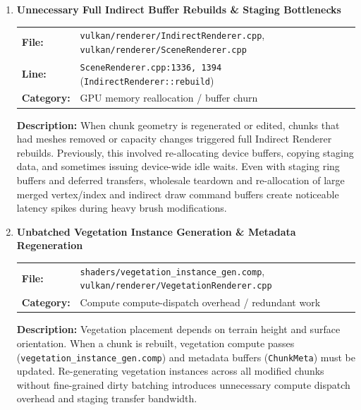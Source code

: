\documentclass[a4paper,12pt]{article}
\newcommand{\severitybox}[2]{%
  \colorbox{#1}{\makebox[2.5cm][c]{\textcolor{white}{\textbf{#2}}}}%
}
\begin{document}
\begin{enumerate}[leftmargin=*]

\item[\textbf{[CR4]}] \textbf{Unnecessary Full Indirect Buffer Rebuilds \& Staging Bottlenecks}
  \hfill \severitybox{highcolor}{HIGH}

  \begin{tabular}{ll}
    \textbf{File:} & \texttt{vulkan/renderer/IndirectRenderer.cpp}, \texttt{vulkan/renderer/SceneRenderer.cpp} \\
    \textbf{Line:} & \texttt{SceneRenderer.cpp:1336, 1394} (\texttt{IndirectRenderer::rebuild}) \\
    \textbf{Category:} & GPU memory reallocation / buffer churn \\
  \end{tabular}

  \textbf{Description:}
  When chunk geometry is regenerated or edited, chunks that had meshes removed or capacity changes triggered full Indirect Renderer rebuilds. Previously, this involved re-allocating device buffers, copying staging data, and sometimes issuing device-wide idle waits. Even with staging ring buffers and deferred transfers, wholesale teardown and re-allocation of large merged vertex/index and indirect draw command buffers create noticeable latency spikes during heavy brush modifications.

\item[\textbf{[CR5]}] \textbf{Unbatched Vegetation Instance Generation \& Metadata Regeneration}
  \hfill \severitybox{mediumcolor}{MEDIUM}

  \begin{tabular}{ll}
    \textbf{File:} & \texttt{shaders/vegetation\_instance\_gen.comp}, \texttt{vulkan/renderer/VegetationRenderer.cpp} \\
    \textbf{Category:} & Compute compute-dispatch overhead / redundant work \\
  \end{tabular}

  \textbf{Description:}
  Vegetation placement depends on terrain height and surface orientation. When a chunk is rebuilt, vegetation compute passes (\texttt{vegetation\_instance\_gen.comp}) and metadata buffers (\texttt{ChunkMeta}) must be updated. Re-generating vegetation instances across all modified chunks without fine-grained dirty batching introduces unnecessary compute dispatch overhead and staging transfer bandwidth.

\end{enumerate}
\end{document}
